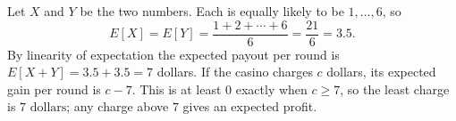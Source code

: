 Let $X$ and $Y$ be the two numbers. Each is equally likely to be $1,\dots,6$, so
\[
E[X]=E[Y]=\dfrac{1+2+\cdots+6}{6}=\dfrac{21}{6}=3.5 .
\]
By linearity of expectation the expected payout per round is $E[X+Y]=3.5+3.5=7$ dollars. If the casino charges $c$ dollars, its expected gain per round is $c-7$. This is at least $0$ exactly when $c\ge7$, so the least charge is $\boxed{7\text{ dollars}}$; any charge above $7$ gives an expected profit.
